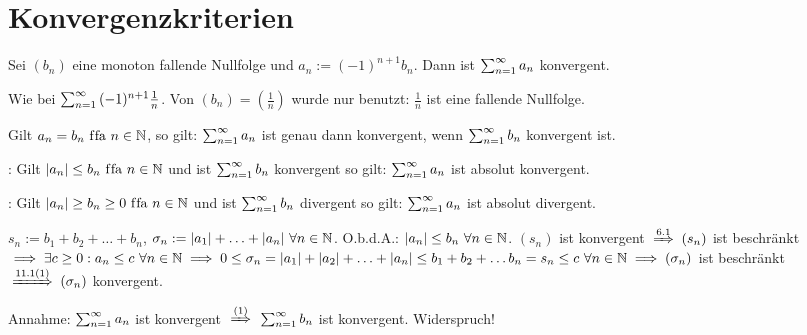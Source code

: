 \documentclass[a4paper,twoside,DIV15,BCOR12mm]{scrbook}
\begin{document}
\chapter{Konvergenzkriterien}

\begin{satz}[Leibnizkriterium]
Sei $(b_n)$ eine monoton fallende Nullfolge und $a_n := (-1)^{n+1}b_n$. Dann ist $\sum_{n=1}^{\infty}{a_n}$ konvergent.
\end{satz}
\begin{beweis}
Wie bei $\sum_{n=1}^{\infty}{(-1)^{n+1}\frac{1}{n}}$. Von $(b_n)=(\frac{1}{n})$ wurde nur benutzt: $\frac{1}{n}$ ist eine fallende Nullfolge.
\end{beweis}
\begin{bemerkung}
Gilt $a_n=b_n \text{ f\/fa } n\in\mathbb{N}$, so gilt: $\sum_{n=1}^{\infty}{a_n}$ ist genau dann konvergent, wenn $\sum_{n=1}^{\infty}{b_n}$ konvergent ist.
\end{bemerkung}

\begin{satz}
\begin{liste}
\item {}: Gilt $|a_n|\le b_n \text{ f\/fa } n\in\mathbb{N}$ und  ist $\sum_{n=1}^{\infty}{b_n}$ konvergent so gilt: $\sum_{n=1}^{\infty}{a_n}$ ist absolut konvergent.
\item {}: Gilt $|a_n|\ge b_n \ge 0 \text{ f\/fa } n\in\mathbb{N}$ und  ist $\sum_{n=1}^{\infty}{b_n}$ divergent so gilt: $\sum_{n=1}^{\infty}{a_n}$ ist absolut divergent.
\end{liste}
\end{satz}

\begin{beweise}
\item $s_n := b_1 +b_2+ \ldots + b_n$, $\sigma_n := |a_1|+\ldots+|a_n| \ \forall n\in\mathbb{N}$. O.b.d.A.: $|a_n| \le b_n \ \forall n\in\MdN$. $(s_n)$ ist konvergent $\folgtnach{6.1} (s_n)$ ist beschränkt $\implies \exists c\ge0: a_n \le c \ \forall n\in\mathbb{N} \implies 0 \le \sigma_n = |a_1| + |a_2| + \ldots + |a_n| \le b_1 + b_2 + \ldots b_n = s_n \le c \ \forall n\in\mathbb{N} \implies (\sigma_n)$ ist beschränkt $\folgtnach{11.1(1)} (\sigma_n)$ konvergent.
\item Annahme: $\sum_{n=1}^{\infty}{a_n}$ ist konvergent $\folgtnach{(1)}$ $\sum_{n=1}^{\infty}{b_n}$ ist konvergent. Widerspruch!
\end{beweise}
\end{document}
